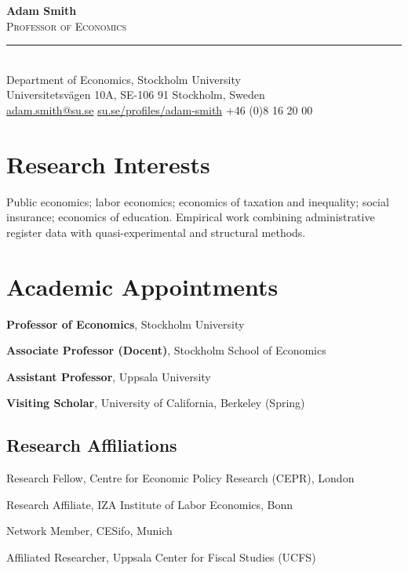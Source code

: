 \documentclass[11pt]{article}
\newcommand{\dated}[2]{%
  \noindent\makebox[5.2em][l]{\textcolor{mutedgray}{#1}}%
  \begin{minipage}[t]{\dimexpr\linewidth-5.4em\relax}#2\end{minipage}\par\vspace{3pt}}
\begin{document}
\begin{center}
  {\Huge\bfseries\color{accent} Adam Smith}\\[6pt]
  {\large\scshape Professor of Economics}\\[8pt]
  {\color{rulegray}\rule{0.55\linewidth}{0.8pt}}\\[8pt]
  \normalsize
  Department of Economics, Stockholm University\\
  Universitetsv\"agen 10A, SE-106 91 Stockholm, Sweden\\[4pt]
  \href{mailto:adam.smith@su.se}{adam.smith@su.se} \quad\textbullet\quad
  \href{https://www.su.se/english/profiles/adsm-economics}{su.se/profiles/adam-smith} \quad\textbullet\quad
  +46 (0)8 16 20 00
\end{center}

\vspace{4pt}

\section{Research Interests}
Public economics; labor economics; economics of taxation and inequality;
social insurance; economics of education. Empirical work combining
administrative register data with quasi-experimental and structural methods.

\section{Academic Appointments}
\dated{2021--}{\textbf{Professor of Economics}, Stockholm University}
\dated{2016--21}{\textbf{Associate Professor (Docent)}, Stockholm School of Economics}
\dated{2011--16}{\textbf{Assistant Professor}, Uppsala University}
\dated{2014}{\textbf{Visiting Scholar}, University of California, Berkeley (Spring)}

\subsection{Research Affiliations}
\dated{2019--}{Research Fellow, Centre for Economic Policy Research (CEPR), London}
\dated{2017--}{Research Affiliate, IZA Institute of Labor Economics, Bonn}
\dated{2018--}{Network Member, CESifo, Munich}
\dated{2020--}{Affiliated Researcher, Uppsala Center for Fiscal Studies (UCFS)}
\end{document}
